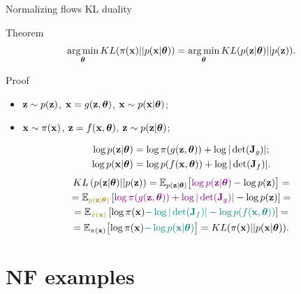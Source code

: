 \begin{frame}{Normalizing flows KL duality}
	\begin{block}{Theorem}
		\vspace{-0.3cm}
		\[
			\operatorname*{arg\,min}_{\boldsymbol{\theta}} KL(\pi(\mathbf{x}) || p(\mathbf{x} | \boldsymbol{\theta})) = \operatorname*{arg\,min}_{\boldsymbol{\theta}} KL(p(\mathbf{z} | \boldsymbol{\theta}) || p(\mathbf{z})).
		\]
		\vspace{-0.5cm}
	\end{block}
	\begin{block}{Proof}
		\begin{itemize}
			\item $\mathbf{z} \sim p(\mathbf{z})$, $\mathbf{x} = g(\mathbf{z}, \boldsymbol{\theta})$, $\mathbf{x} \sim p(\mathbf{x}| \boldsymbol{\theta})$;
			\item $\mathbf{x} \sim \pi(\mathbf{x})$, $\mathbf{z} = f(\mathbf{x}, \boldsymbol{\theta})$, $\mathbf{z} \sim p(\mathbf{z} | \boldsymbol{\theta})$;
		\end{itemize}
		\vspace{-0.3cm}
		\begin{align*}
			\log p(\mathbf{z} | \boldsymbol{\theta}) &= \log \pi(g(\mathbf{z}, \boldsymbol{\theta})) + \log | \det ( \mathbf{J}_g) |; \\
			\log p(\mathbf{x} | \boldsymbol{\theta}) &= \log p(f(\mathbf{x}, \boldsymbol{\theta})) + \log | \det ( \mathbf{J}_f) |.
		\end{align*}
		\vspace{-0.9cm}
		\begin{multline*}
			KL\left(p(\bz | \btheta) || p(\bz) \right) = \mathbb{E}_{p(\bz | \btheta)} \bigl[ {\color{violet}\log p(\bz | \btheta)} - \log p(\bz) \bigr] = \\ 
			= \mathbb{E}_{{\color{olive}p(\bz | \btheta)}} \left[ {\color{violet}\log \pi(g(\bz, \btheta)) +  \log |\det (\bJ_g)|} - \log p(\bz) \right] = \\
			= \mathbb{E}_{{\color{olive}\pi(\bx)}} \left[ \log \pi(\bx) {\color{teal} - \log |\det (\bJ_f)| - \log p(f(\bx, \btheta))} \right] = \\
			= \mathbb{E}_{\pi(\bx)} \bigl[ \log \pi(\bx) {\color{teal} -\log p(\bx | \btheta)} \bigr] = KL (\pi(\bx) || p(\bx | \btheta)).
		\end{multline*}
	\end{block}
\end{frame}
\section{NF examples}

